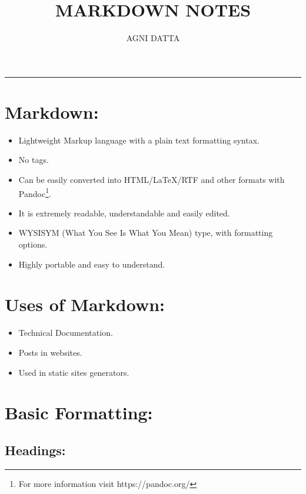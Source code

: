 \documentclass[12pt,british]{article}
\begin{document}
\title{\textsf{\textbf{MARKDOWN NOTES}}}
\author{AGNI DATTA}
\maketitle
\begin{center}
	\rule[0.5ex]{0.5\columnwidth}{0.5pt}
	\par\end{center}

\tableofcontents{}

\newpage{}

\vfill{}


\section{Markdown:}
\begin{itemize}
	\item Lightweight Markup language with a plain text formatting syntax.
	\item No tags.
	\item Can be easily converted into HTML/\LaTeX /RTF\: and other formats
	      with Pandoc\footnote{For more information visit https://pandoc.org/}.
	\item It is extremely readable, understandable and easily edited.
	\item WYSISYM (What You See Is What You Mean) type, with formatting options.
	\item Highly portable and easy to understand.
\end{itemize}

\section{Uses of Markdown:}
\begin{itemize}
	\item Technical Documentation.
	\item Posts in websites.
	\item Used in static sites generators.
\end{itemize}
\vfill{}

\pagebreak{}

\section{Basic Formatting:}

\subsection{Headings:}
\end{document}
